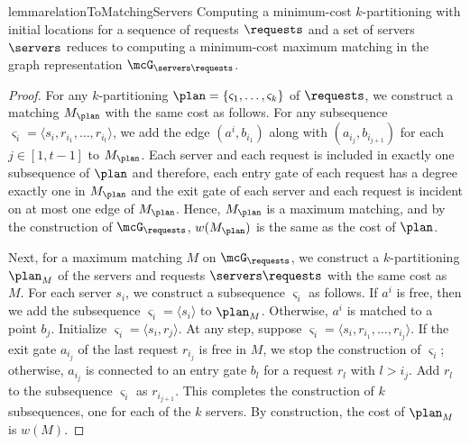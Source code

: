 \begin{restatable}{lemma}{relationToMatchingServers}\label{lemma:relationToMatchingServers}
    Computing a minimum-cost $k$-partitioning with initial locations for a sequence of requests $\requests$ and a set of servers $\servers$ reduces to computing a minimum-cost maximum matching in the graph representation $\mcG_{\servers\requests}$.
\end{restatable}
\begin{proof}
For any $k$-partitioning $\plan=\{\varsigma_1,\ldots, \varsigma_k\}$ of $\requests$, we construct a matching $M_\plan$ with the same cost as follows. For any subsequence $\varsigma_i=\langle s_i, r_{i_1}, \ldots, r_{i_t}\rangle$, we add the edge $(a^i, b_{i_1})$ along with $(a_{i_j}, b_{i_{j+1}})$ for each $j\in[1, t-1]$ to $M_\plan$. Each server and each request is included in exactly one subsequence of $\plan$ and therefore, each entry gate of each request has a degree exactly one in $M_\plan$ and the exit gate of each server and each request is incident on at most one edge of $M_\plan$. Hence, $M_\plan$ is a maximum matching, and by the construction of $\mcG_\requests$, $w(M_\plan)$ is the same as the cost of $\plan$.

Next, for a maximum matching $M$ on $\mcG_\requests$, we construct a $k$-partitioning $\plan_M$ of the servers and requests $\servers\requests$ with the same cost as $M$. For each server $s_i$, we construct a subsequence $\varsigma_i$ as follows. If $a^i$ is free, then we add the subsequence $\varsigma_i=\langle s_i\rangle$ to $\plan_M$. Otherwise, $a^i$ is matched to a point $b_j$. Initialize $\varsigma_i=\langle s_i, r_j\rangle$. At any step, suppose $\varsigma_i=\langle s_i, r_{i_1}, \ldots, r_{i_j}\rangle$. If the exit gate $a_{i_j}$ of the last request $r_{i_j}$ is free in $M$, we stop the construction of $\varsigma_i$; otherwise, $a_{i_j}$ is connected to an entry gate $b_{l}$ for a request $r_{l}$ with $l>i_j$. Add $r_l$ to the subsequence $\varsigma_i$ as $r_{i_{j+1}}$. This completes the construction of $k$ subsequences, one for each of the $k$ servers. By construction, the cost of $\plan_M$ is $w(M)$.
\end{proof}



%



%
%

%
%
%
%
%
%
%

%

%
%
%
%

